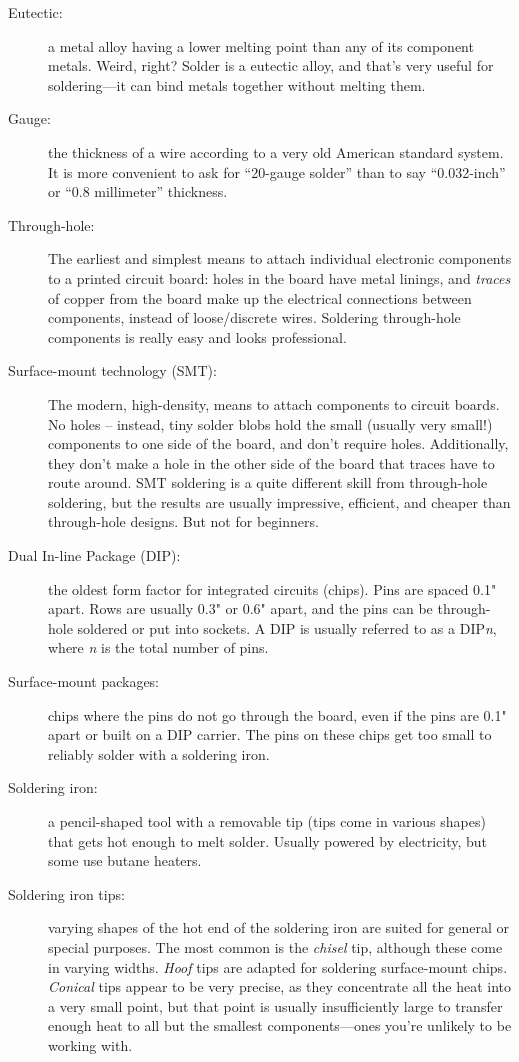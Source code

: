 \documentclass[12pt]{article}
\newcommand{\+}{\item}
\begin{document}
\begin{description}
\+[Eutectic:] a metal alloy having a lower melting point than any of its component metals. Weird, right? Solder is a eutectic alloy, and that's very useful for soldering---it can bind metals together without melting them.

\+[Gauge:] the thickness of a wire according to a very old American standard system. It is more convenient to ask for ``20-gauge solder'' than to say ``0.032-inch'' or ``0.8 millimeter'' thickness.

\+[Through-hole:] The earliest and simplest means to attach individual electronic components to a printed circuit board: holes in the board have metal linings, and \emph{traces} of copper from the board make up the electrical connections between components, instead of loose/discrete wires. Soldering through-hole components is really easy and looks professional.

\+[Surface-mount technology (SMT):] The modern, high-density, means to attach components to circuit boards. No holes -- instead, tiny solder blobs hold the small (usually very small!) components to one side of the board, and don't require holes. Additionally, they don't make a hole in the other side of the board that traces have to route around. SMT soldering is a quite different skill from through-hole soldering, but the results are usually impressive, efficient, and cheaper than through-hole designs. But not for beginners.

\+[Dual In-line Package (DIP):] the oldest form factor for integrated circuits (chips). Pins are spaced 0.1" apart. Rows are usually 0.3" or 0.6" apart, and the pins can be through-hole soldered or put into sockets. A DIP is usually referred to as a DIP\emph{n}, where \emph{n} is the total number of pins. 

\+[Surface-mount packages:] chips where the pins do not go through the board, even if the pins are 0.1" apart or built on a DIP carrier. The pins on these chips get too small to reliably solder with a soldering iron.

\+[Soldering iron:] a pencil-shaped tool with a removable tip (tips come in various shapes) that gets hot enough to melt solder. Usually powered by electricity, but some use butane heaters.

\+[Soldering iron tips:] varying shapes of the hot end of the soldering iron are suited for general or special purposes. The most common is the \emph{chisel} tip, although these come in varying widths. \emph{Hoof} tips are adapted for soldering surface-mount chips. \emph{Conical} tips appear to be very precise, as they concentrate all the heat into a very small point, but that point is usually insufficiently large to transfer enough heat to all but the smallest components---ones you're unlikely to be working with.


\end{description}
\end{document}
